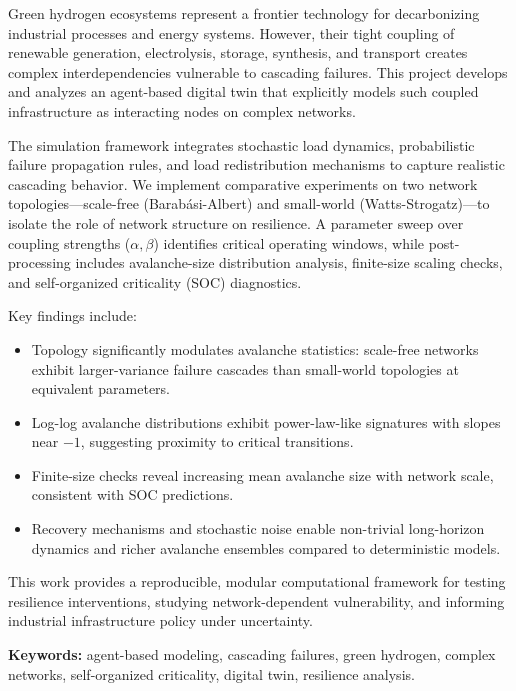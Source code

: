 \documentclass[12pt,a4paper,twoside]{report}
\begin{document}
Green hydrogen ecosystems represent a frontier technology for decarbonizing industrial processes and energy systems. However, their tight coupling of renewable generation, electrolysis, storage, synthesis, and transport creates complex interdependencies vulnerable to cascading failures. This project develops and analyzes an agent-based digital twin that explicitly models such coupled infrastructure as interacting nodes on complex networks. 

The simulation framework integrates stochastic load dynamics, probabilistic failure propagation rules, and load redistribution mechanisms to capture realistic cascading behavior. We implement comparative experiments on two network topologies---scale-free (Barab\'asi-Albert) and small-world (Watts-Strogatz)---to isolate the role of network structure on resilience. A parameter sweep over coupling strengths ($\alpha, \beta$) identifies critical operating windows, while post-processing includes avalanche-size distribution analysis, finite-size scaling checks, and self-organized criticality (SOC) diagnostics.

Key findings include:
\begin{itemize}
\item Topology significantly modulates avalanche statistics: scale-free networks exhibit larger-variance failure cascades than small-world topologies at equivalent parameters.
\item Log-log avalanche distributions exhibit power-law-like signatures with slopes near $-1$, suggesting proximity to critical transitions.
\item Finite-size checks reveal increasing mean avalanche size with network scale, consistent with SOC predictions.
\item Recovery mechanisms and stochastic noise enable non-trivial long-horizon dynamics and richer avalanche ensembles compared to deterministic models.
\end{itemize}

This work provides a reproducible, modular computational framework for testing resilience interventions, studying network-dependent vulnerability, and informing industrial infrastructure policy under uncertainty.

\vspace{0.5cm}
\noindent
\textbf{Keywords:} agent-based modeling, cascading failures, green hydrogen, complex networks, self-organized criticality, digital twin, resilience analysis.

\newpage
\tableofcontents
\newpage
\end{document}

